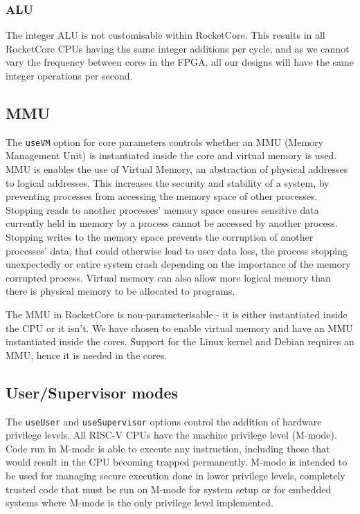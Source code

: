\subsubsection{ALU}
The integer ALU is not customisable within RocketCore. This results in all RocketCore CPUs having the same integer additions per cycle, and as we cannot vary the frequency between cores in the FPGA, all our designs will have the same integer operations per second.

\subsubsection{}

\subsection{MMU}
The \texttt{useVM} option for core parameters controls whether an MMU (Memory Management Unit) is instantiated inside the core and virtual memory is used. MMU is enables the use of Virtual Memory, an abstraction of physical addresses to logical addresses. This increases the security and stability of a system, by preventing processes from accessing the memory space of other processes. Stopping reads to another processes' memory space ensures sensitive data currently held in memory by a process cannot be accessed by another process. Stopping writes to the memory space prevents the corruption of another processes' data, that could otherwise lead to user data loss, the process stopping unexpectedly or entire system crash depending on the importance of the memory corrupted process. Virtual memory can also allow more logical memory than there is physical memory to be allocated to programs.

The MMU in RocketCore is non-parameterisable - it is either instantiated inside the CPU or it isn't. We have chosen to enable virtual memory and have an MMU instantiated inside the cores. Support for the Linux kernel and Debian requires an MMU, hence it is needed in the cores. %

\subsection{User/Supervisor modes}
The \texttt{useUser} and \texttt{useSupervisor} options control the addition of hardware privilege levels. All RISC-V CPUs have the machine privilege level (M-mode). Code run in M-mode is able to execute any instruction, including those that would result in the CPU becoming trapped permanently. M-mode is intended to be used for managing secure execution done in lower privilege levels, completely trusted code that must be run on M-mode for system setup or for embedded systems where M-mode is the only privilege level implemented.

